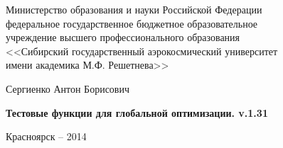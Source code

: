 \thispagestyle{empty}

\begin{center}
Министерство образования и науки Российской Федерации \\ федеральное государственное бюджетное образовательное \\ учреждение высшего профессионального образования \\<<Сибирский государственный аэрокосмический университет \\ имени академика М.Ф. Решетнева>>
\end{center}

\vspace{20mm}


\vspace{30mm}
\begin{center}
{\large Сергиенко Антон Борисович}
\end{center}

\vspace{5mm}
\begin{center}
{\bf \large Тестовые функции для глобальной оптимизации. v.1.31
\par}

\vspace{10mm}


\vspace{10mm}

\end{center}

\vspace{80mm}


\vspace{20mm}
\begin{center}
{Красноярск -- 2014}
\end{center}

\newpage